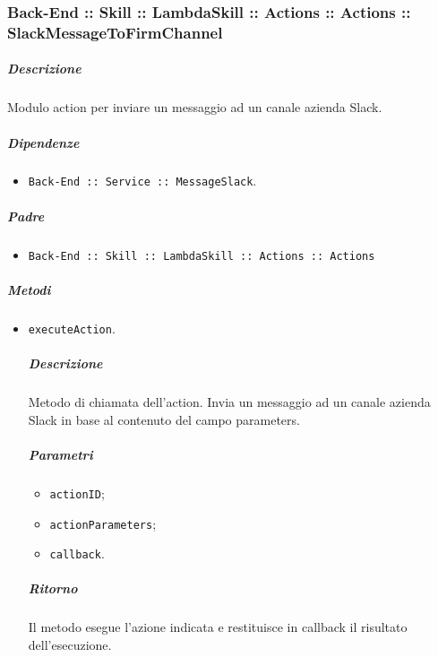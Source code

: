 \documentclass[../ManualeSviluppatore_v2.0.0.tex]{subfiles}
\begin{document}
\subsubsection{Back-End :: Skill :: LambdaSkill :: Actions :: Actions :: SlackMessageToFirmChannel}
\subparagraph{Descrizione} Modulo action per inviare un messaggio ad un canale azienda Slack.
\subparagraph{Dipendenze}
\begin{itemize}
	\item \texttt{Back-End :: Service :: MessageSlack}.
\end{itemize}
\subparagraph{Padre}
\begin{itemize}
	\item \texttt{Back-End :: Skill :: LambdaSkill :: Actions :: Actions}
\end{itemize}
\subparagraph{Metodi}
\begin{itemize}
	\item \texttt{executeAction}.
	      \subparagraph{Descrizione} Metodo di chiamata dell'action. Invia un messaggio ad un canale azienda Slack in base al contenuto del campo parameters.
	      \subparagraph{Parametri}
	      \begin{itemize}
	      	\item \texttt{actionID};
	      	\item \texttt{actionParameters};
	      	\item \texttt{callback}.
	      \end{itemize}
	      \subparagraph{Ritorno} Il metodo esegue l'azione indicata e restituisce in callback il risultato dell'esecuzione.
\end{itemize}
\end{document}
